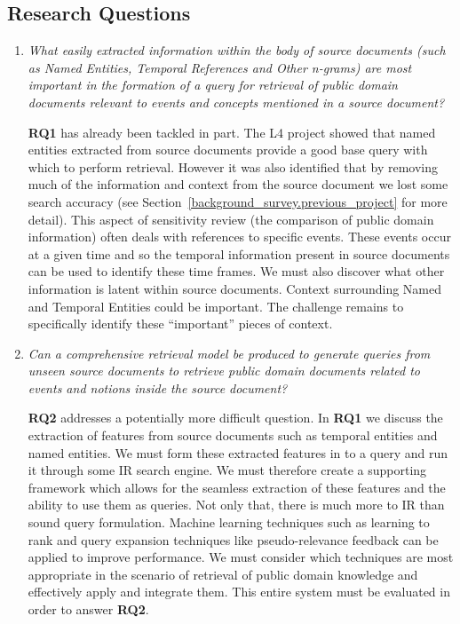 \documentclass{mprop}
\begin{document}
\subsection{Research Questions}
\begin{enumerate}[label=\textbf{RQ.\arabic*}]
\item \textit{What easily extracted information within the body of source documents (such as Named Entities, Temporal References and Other n-grams) are most important in the formation of a query for retrieval of public domain documents relevant to events and concepts mentioned in a source document? }

\textbf{RQ1} has already been tackled in part. The L4 project showed that named entities extracted from source documents provide a good base query with which to perform retrieval. However it was also identified that by removing much of the information and context from the source document we lost some search accuracy (see Section~\ref{background_survey.previous_project} for more detail). This aspect of sensitivity review (the comparison of public domain information) often deals with references to specific events. These events occur at a given time and so the temporal information present in source documents can be used to identify these time frames. We must also discover what other information is latent within source documents. Context surrounding Named and Temporal Entities could be important. The challenge remains to specifically identify these ``important'' pieces of context.

\item \textit{Can a comprehensive retrieval model be produced to generate queries from unseen source documents to retrieve public domain documents related to events and notions inside the source document?}

\textbf{RQ2} addresses a potentially more difficult question. In \textbf{RQ1} we discuss the extraction of features from source documents such as temporal entities and named entities. We must form these extracted features in to a query and run it through some IR search engine. We must therefore create a supporting framework which allows for the seamless extraction of these features and the ability to use them as queries. Not only that, there is much more to IR than sound query formulation. Machine learning techniques such as learning to rank and query expansion techniques like pseudo-relevance feedback can be applied to improve performance. We must consider which techniques are most appropriate in the scenario of retrieval of public domain knowledge and effectively apply and integrate them. This entire system must be evaluated in order to answer \textbf{RQ2}.
\end{enumerate}
\end{document}
